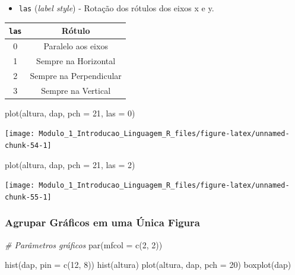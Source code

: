 \documentclass[
]{article}
\newenvironment{Shaded}{\begin{snugshade}}{\end{snugshade}}
\newcommand{\AttributeTok}[1]{\textcolor[rgb]{0.77,0.63,0.00}{#1}}
\newcommand{\CommentTok}[1]{\textcolor[rgb]{0.56,0.35,0.01}{\textit{#1}}}
\newcommand{\DecValTok}[1]{\textcolor[rgb]{0.00,0.00,0.81}{#1}}
\newcommand{\FunctionTok}[1]{\textcolor[rgb]{0.00,0.00,0.00}{#1}}
\newcommand{\NormalTok}[1]{#1}
\providecommand{\tightlist}{%
  \setlength{\itemsep}{0pt}\setlength{\parskip}{0pt}}
\begin{document}
\begin{itemize}
\tightlist
\item
  \texttt{las} (\emph{label style}) - Rotação dos rótulos dos eixos x e
  y.
\end{itemize}

\begin{longtable}[]{@{}cc@{}}
\toprule()
\texttt{las} & Rótulo \\
\midrule()
\endhead
0 & Paralelo aos eixos \\
1 & Sempre na Horizontal \\
2 & Sempre na Perpendicular \\
3 & Sempre na Vertical \\
\bottomrule()
\end{longtable}

\begin{Shaded}
\begin{Highlighting}[]
\FunctionTok{plot}\NormalTok{(altura, dap, }\AttributeTok{pch =} \DecValTok{21}\NormalTok{, }\AttributeTok{las =} \DecValTok{0}\NormalTok{)}
\end{Highlighting}
\end{Shaded}

\begin{center}\texttt{[image: Modulo\_1\_Introducao\_Linguagem\_R\_files/figure-latex/unnamed-chunk-54-1]} \end{center}

\begin{Shaded}
\begin{Highlighting}[]
\FunctionTok{plot}\NormalTok{(altura, dap, }\AttributeTok{pch =} \DecValTok{21}\NormalTok{, }\AttributeTok{las =} \DecValTok{2}\NormalTok{)}
\end{Highlighting}
\end{Shaded}

\begin{center}\texttt{[image: Modulo\_1\_Introducao\_Linguagem\_R\_files/figure-latex/unnamed-chunk-55-1]} \end{center}

\hypertarget{agrupar-gruxe1ficos-em-uma-uxfanica-figura}{%
\subsubsection{Agrupar Gráficos em uma Única
Figura}\label{agrupar-gruxe1ficos-em-uma-uxfanica-figura}}

\begin{Shaded}
\begin{Highlighting}[]
\CommentTok{\# Parâmetros gráficos}
\FunctionTok{par}\NormalTok{(}\AttributeTok{mfcol =} \FunctionTok{c}\NormalTok{(}\DecValTok{2}\NormalTok{, }\DecValTok{2}\NormalTok{))}

\FunctionTok{hist}\NormalTok{(dap, }\AttributeTok{pin =} \FunctionTok{c}\NormalTok{(}\DecValTok{12}\NormalTok{, }\DecValTok{8}\NormalTok{))}
\FunctionTok{hist}\NormalTok{(altura)}
\FunctionTok{plot}\NormalTok{(altura, dap, }\AttributeTok{pch =} \DecValTok{20}\NormalTok{)}
\FunctionTok{boxplot}\NormalTok{(dap)}
\end{Highlighting}
\end{Shaded}
\end{document}
